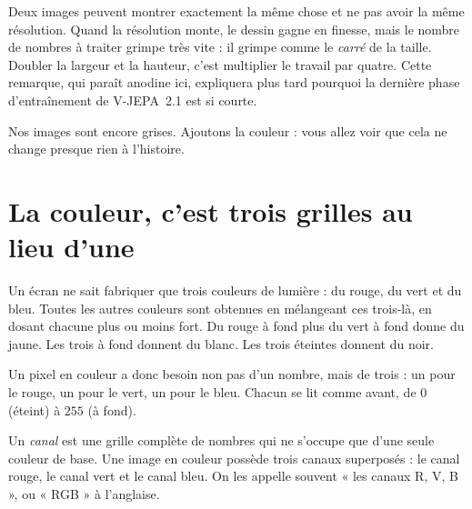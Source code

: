 \begin{aretenir}
Deux images peuvent montrer exactement la même chose et ne pas avoir la
même résolution. Quand la résolution monte, le dessin gagne en finesse,
mais le nombre de nombres à traiter grimpe très vite : il grimpe comme le
\emph{carré} de la taille. Doubler la largeur et la hauteur, c'est
multiplier le travail par quatre. Cette remarque, qui paraît anodine ici,
expliquera plus tard pourquoi la dernière phase d'entraînement de
V-JEPA~2.1 est si courte.
\end{aretenir}

Nos images sont encore grises. Ajoutons la couleur : vous allez voir que
cela ne change presque rien à l'histoire.

\section{La couleur, c'est trois grilles au lieu d'une}

Un écran ne sait fabriquer que trois couleurs de lumière : du rouge, du
vert et du bleu. Toutes les autres couleurs sont obtenues en mélangeant ces
trois-là, en dosant chacune plus ou moins fort. Du rouge à fond plus du
vert à fond donne du jaune. Les trois à fond donnent du blanc. Les trois
éteintes donnent du noir.

Un pixel en couleur a donc besoin non pas d'un nombre, mais de trois : un
pour le rouge, un pour le vert, un pour le bleu. Chacun se lit comme avant,
de $0$ (éteint) à $255$ (à fond).

\begin{definition}[Le canal][canal]
Un \emph{canal} est une grille complète de nombres qui ne s'occupe que
d'une seule couleur de base. Une image en couleur possède trois canaux
superposés : le canal rouge, le canal vert et le canal bleu. On les appelle
souvent « les canaux R, V, B », ou « RGB » à l'anglaise.
\end{definition}


